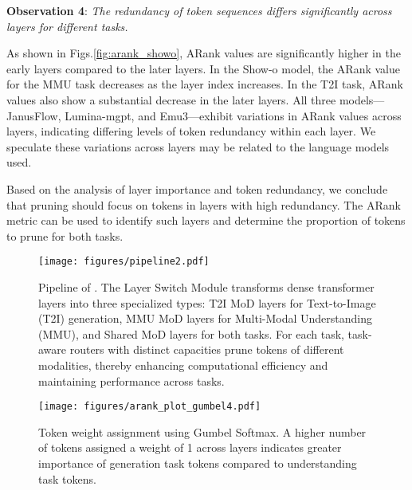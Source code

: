 \textbf{Observation 4}: \textit{The redundancy of token sequences differs significantly across layers for different tasks.}

As shown in Figs.\ref{fig:arank_showo}, ARank values are significantly higher in the early layers compared to the later layers. In the Show-o model, the ARank value for the MMU task decreases as the layer index increases. In the T2I task, ARank values also show a substantial decrease in the later layers. All three models—JanusFlow, Lumina-mgpt, and Emu3—exhibit variations in ARank values across layers, indicating differing levels of token redundancy within each layer. We speculate these variations across layers may be related to the language models used.

Based on the analysis of layer importance and token redundancy, we conclude that pruning should focus on tokens in layers with high redundancy. The ARank metric can be used to identify such layers and determine the proportion of tokens to prune for both tasks.



% 

\begin{figure*}
    \centering
    \texttt{[image: figures/pipeline2.pdf]}
    

    \caption{Pipeline of \method{}. The Layer Switch Module transforms dense transformer layers into three specialized types: T2I MoD layers for Text-to-Image (T2I) generation, MMU MoD layers for Multi-Modal Understanding (MMU), and Shared MoD layers for both tasks. For each task, task-aware routers with distinct capacities prune tokens of different modalities, thereby enhancing computational efficiency and maintaining performance across tasks.}

    \label{fig:pipeline}
    \vspace{-10pt}
\end{figure*}



\begin{figure}[h] %
    \centering
    \texttt{[image: figures/arank\_plot\_gumbel4.pdf]}
    \vspace{-15pt}
    \caption{Token weight assignment using Gumbel Softmax. A higher number of tokens assigned a weight of 1 across layers indicates greater importance of generation task tokens compared to understanding task tokens.}
    \label{fig:gumbel_softmax}
    \vspace{-5pt}
\end{figure}


